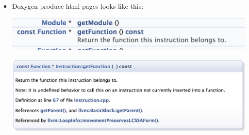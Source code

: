 \documentclass[a4paper,11pt,twoside]{book}
\begin{document}
\begin{itemize}
	\item Doxygen produce html pages looks like this:
	
	\includegraphics[scale=0.45]{pics/dox1.png}  \medskip
	
	\includegraphics[scale=0.45]{pics/dox2.png} 
	
\end{itemize}
\end{document}
